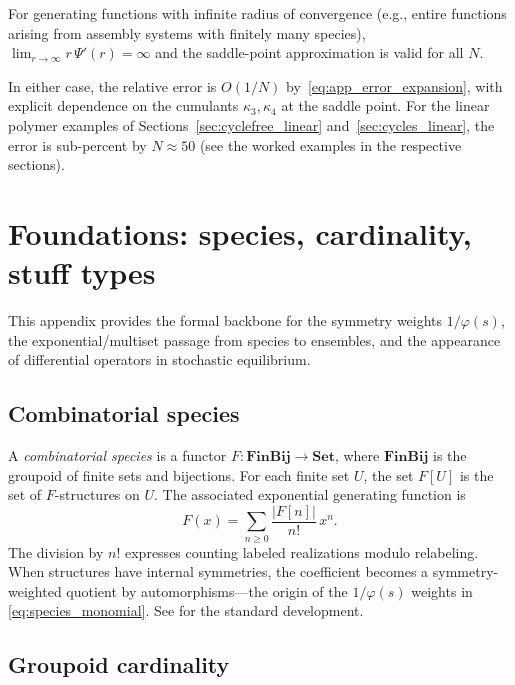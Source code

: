 \documentclass[11pt]{amsart}
\newcommand{\GFcomb}{\Psi}
\theoremstyle{definition}
\theoremstyle{plain}
\theoremstyle{remark}
\begin{document}
For generating functions with infinite radius of convergence (e.g., entire functions arising from assembly systems with finitely many species), $\lim_{r\to\infty}r\,\GFcomb'(r)=\infty$ and the saddle-point approximation is valid for all $N$.

In either case, the relative error is $O(1/N)$ by~\eqref{eq:app_error_expansion}, with explicit dependence on the cumulants $\kappa_3,\kappa_4$ at the saddle point.
For the linear polymer examples of Sections~\ref{sec:cyclefree_linear} and~\ref{sec:cycles_linear}, the error is sub-percent by $N\approx 50$ (see the worked examples in the respective sections).


\section{Foundations: species, cardinality, stuff types}
\label{app:foundations}

This appendix provides the formal backbone for the symmetry weights $1/\varphi(s)$, the exponential/multiset passage from species to ensembles, and the appearance of differential operators in stochastic equilibrium.

\subsection{Combinatorial species}

A \emph{combinatorial species} is a functor $F:\mathbf{FinBij}\to \mathbf{Set}$, where $\mathbf{FinBij}$ is the groupoid of finite sets and bijections.
For each finite set $U$, the set $F[U]$ is the set of $F$-structures on $U$.
The associated exponential generating function is
\begin{equation}\label{eq:app_species_egf}
F(x)=\sum_{n\ge 0}\frac{|F[n]|}{n!}\,x^n.
\end{equation}
The division by $n!$ expresses counting labeled realizations modulo relabeling.
When structures have internal symmetries, the coefficient becomes a symmetry-weighted quotient by automorphisms---the origin of the $1/\varphi(s)$ weights in \eqref{eq:species_monomial}.
See \cite{joyal1981theorie,bergeron1998combinatorial} for the standard development.

\subsection{Groupoid cardinality}
\end{document}
